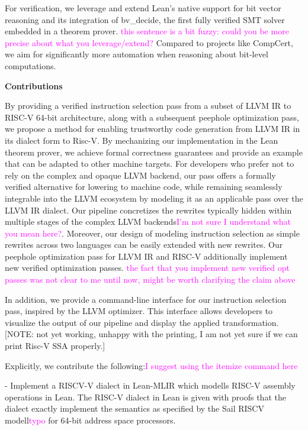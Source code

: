 For verification, we leverage and extend Lean’s native support for bit vector reasoning and its integration of bv\_decide, 
the first fully verified SMT solver embedded in a theorem prover. 
\textcolor{magenta}{this sentence is a bit fuzzy: could you be more precise about what you leverage/extend?}
Compared to projects like CompCert, we aim for significantly more automation when reasoning about bit-level computations. 

\textbf{Contributions }

By providing a verified instruction selection pass from a subset of LLVM IR to RISC-V 64-bit architecture, 
along with a subsequent peephole optimization pass, we propose a method for enabling trustworthy code generation 
from LLVM IR in its dialect form to Risc-V. By mechanizing our implementation in the Lean theorem prover, we achieve 
formal correctness guarantees and provide an example that can be adapted to other machine targets. 
For developers who prefer not to rely on the complex and opaque LLVM backend, our pass offers a formally verified 
alternative for lowering to machine code, while remaining seamlessly integrable into the LLVM ecosystem by 
modeling it as an applicable pass over the LLVM IR dialect. Our pipeline concretizes the rewrites typically 
hidden within multiple stages of the complex LLVM backends\textcolor{magenta}{I'm not sure I understand 
what you mean here?}. Moreover, our design of modeling instruction selection 
as simple rewrites across two languages can be easily extended with new rewrites.
Our peephole optimization pass for LLVM IR and RISC-V additionally implement new verified optimization passes.
\textcolor{magenta}{the fact that you implement new verified opt passes was not clear to me until now, 
might be worth clarifying the claim above}

In addition, we provide a command-line interface for our instruction selection pass, inspired by the LLVM optimizer. 
This interface allows developers to visualize the output of our pipeline and display the applied transformation.
[NOTE: not yet working, unhappy with the printing, I am not yet sure if we can print Risc-V SSA properly.]

Explicitly, we contribute the following:\textcolor{magenta}{I suggest using the itemize command here}

- Implement a RISCV-V dialect in Lean-MLIR which modells RISC-V assembly operations in Lean. 
  The RISC-V dialect in Lean is given with proofs that the dialect exactly implement the semantics as specified by the 
  Sail RISCV modell\textcolor{magenta}{typo} for 64-bit address space processors.


